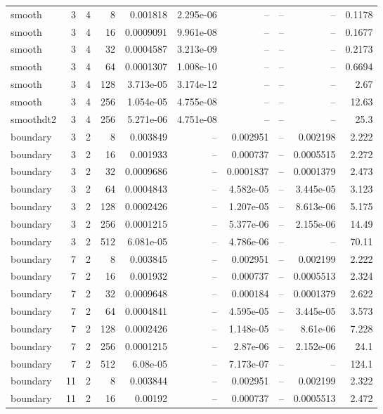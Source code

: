 \begin{tabular}{lrrrrrrrrr}
smooth & 3 & 4 & 8 & 0.001818 & 2.295e-06 & -- & -- & -- & 0.1178 \\
smooth & 3 & 4 & 16 & 0.0009091 & 9.961e-08 & -- & -- & -- & 0.1677 \\
smooth & 3 & 4 & 32 & 0.0004587 & 3.213e-09 & -- & -- & -- & 0.2173 \\
smooth & 3 & 4 & 64 & 0.0001307 & 1.008e-10 & -- & -- & -- & 0.6694 \\
smooth & 3 & 4 & 128 & 3.713e-05 & 3.174e-12 & -- & -- & -- & 2.67 \\
smooth & 3 & 4 & 256 & 1.054e-05 & 4.755e-08 & -- & -- & -- & 12.63 \\
smoothdt2 & 3 & 4 & 256 & 5.271e-06 & 4.751e-08 & -- & -- & -- & 25.3 \\
boundary & 3 & 2 & 8 & 0.003849 & -- & 0.002951 & -- & 0.002198 & 2.222 \\
boundary & 3 & 2 & 16 & 0.001933 & -- & 0.000737 & -- & 0.0005515 & 2.272 \\
boundary & 3 & 2 & 32 & 0.0009686 & -- & 0.0001837 & -- & 0.0001379 & 2.473 \\
boundary & 3 & 2 & 64 & 0.0004843 & -- & 4.582e-05 & -- & 3.445e-05 & 3.123 \\
boundary & 3 & 2 & 128 & 0.0002426 & -- & 1.207e-05 & -- & 8.613e-06 & 5.175 \\
boundary & 3 & 2 & 256 & 0.0001215 & -- & 5.377e-06 & -- & 2.155e-06 & 14.49 \\
boundary & 3 & 2 & 512 & 6.081e-05 & -- & 4.786e-06 & -- & -- & 70.11 \\
boundary & 7 & 2 & 8 & 0.003845 & -- & 0.002951 & -- & 0.002199 & 2.222 \\
boundary & 7 & 2 & 16 & 0.001932 & -- & 0.000737 & -- & 0.0005513 & 2.324 \\
boundary & 7 & 2 & 32 & 0.0009648 & -- & 0.000184 & -- & 0.0001379 & 2.622 \\
boundary & 7 & 2 & 64 & 0.0004841 & -- & 4.595e-05 & -- & 3.445e-05 & 3.573 \\
boundary & 7 & 2 & 128 & 0.0002426 & -- & 1.148e-05 & -- & 8.61e-06 & 7.228 \\
boundary & 7 & 2 & 256 & 0.0001215 & -- & 2.87e-06 & -- & 2.152e-06 & 24.1 \\
boundary & 7 & 2 & 512 & 6.08e-05 & -- & 7.173e-07 & -- & -- & 124.1 \\
boundary & 11 & 2 & 8 & 0.003844 & -- & 0.002951 & -- & 0.002199 & 2.322 \\
boundary & 11 & 2 & 16 & 0.00192 & -- & 0.000737 & -- & 0.0005513 & 2.472 \\

\end{tabular}
